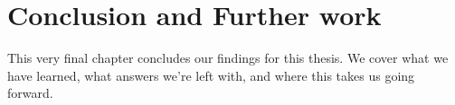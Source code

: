 \chapter{Conclusion and Further work}
\label{chap:conclusion}

This very final chapter concludes our findings for this thesis. We cover what we have learned, what answers we're left with, and where this takes us going forward.





